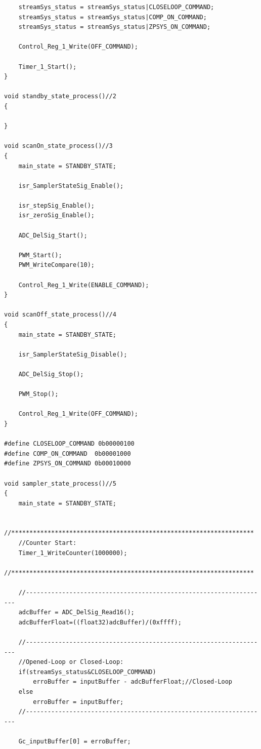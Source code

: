 \documentclass[
	article,			%
	11pt,				%
	oneside,			%
	a4paper,			%
	english,			%
	brazil,				%
	sumario=tradicional
	]{abntex2}
\begin{document}
\begin{apendicesenv}
\begin{lstlisting}
    streamSys_status = streamSys_status|CLOSELOOP_COMMAND;
    streamSys_status = streamSys_status|COMP_ON_COMMAND;
    streamSys_status = streamSys_status|ZPSYS_ON_COMMAND;  
    
    Control_Reg_1_Write(OFF_COMMAND);
    
    Timer_1_Start();
}

void standby_state_process()//2
{
    
}

void scanOn_state_process()//3
{
    main_state = STANDBY_STATE;
    
    isr_SamplerStateSig_Enable();
    
    isr_stepSig_Enable();
    isr_zeroSig_Enable();
    
    ADC_DelSig_Start();

    PWM_Start();
    PWM_WriteCompare(10);
    
    Control_Reg_1_Write(ENABLE_COMMAND);
}

void scanOff_state_process()//4
{
    main_state = STANDBY_STATE;
    
    isr_SamplerStateSig_Disable();
    
    ADC_DelSig_Stop();
    
    PWM_Stop();
    
    Control_Reg_1_Write(OFF_COMMAND);   
}

#define CLOSELOOP_COMMAND 0b00000100
#define COMP_ON_COMMAND  0b00001000
#define ZPSYS_ON_COMMAND 0b00010000

void sampler_state_process()//5
{
    main_state = STANDBY_STATE;
 
    //*******************************************************************
    //Counter Start:
    Timer_1_WriteCounter(1000000);
    //*******************************************************************
       
    //-------------------------------------------------------------------
    adcBuffer = ADC_DelSig_Read16(); 
    adcBufferFloat=((float32)adcBuffer)/(0xffff);    
    
    //-------------------------------------------------------------------
    //Opened-Loop or Closed-Loop:
    if(streamSys_status&CLOSELOOP_COMMAND)
        erroBuffer = inputBuffer - adcBufferFloat;//Closed-Loop        
    else
        erroBuffer = inputBuffer;
    //-------------------------------------------------------------------

    Gc_inputBuffer[0] = erroBuffer; 
    

\end{lstlisting}
\end{apendicesenv}
\end{document}
